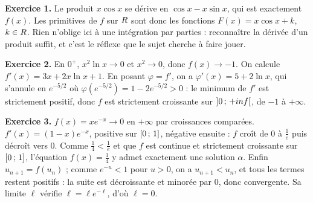 \begin{corrige}
\textbf{Exercice 1.} Le produit $x\cos x$ se dérive en $\cos x - x\sin x$, qui est
exactement $f(x)$. Les primitives de $f$ sur $R$ sont donc les fonctions
$F(x) = x\cos x + k$, $k\in R$. Rien n'oblige ici à une intégration par
parties : reconnaître la dérivée d'un produit suffit, et c'est le réflexe que
le sujet cherche à faire jouer.

\textbf{Exercice 2.} En $0^{+}$, $x^{2}\ln x\to0$ et $x^{2}\to0$, donc $f(x)\to-1$. On
calcule $f'(x) = 3x+2x\ln x+1$. En posant $\varphi = f'$, on a
$\varphi'(x) = 5+2\ln x$, qui s'annule en $e^{-5/2}$ où
$\varphi\!\left(e^{-5/2}\right) = 1-2e^{-5/2}>0$ : le minimum de $f'$ est
strictement positif, donc $f$ est strictement croissante sur
$\left]0\,;\,+inf\right[$, de $-1$ à $+\infty$.

\textbf{Exercice 3.} $f(x) = xe^{-x}\to0$ en $+\infty$ par croissances comparées.
$f'(x) = (1-x)e^{-x}$, positive sur $\left[0\,;\,1\right]$, négative ensuite :
$f$ croît de $0$ à $\frac1e$ puis décroît vers $0$. Comme
$\frac14 < \frac1e$ et que $f$ est continue et strictement croissante sur
$\left[0\,;\,1\right]$, l'équation $f(x) = \frac14$ y admet exactement une
solution $\alpha$. Enfin $u_{n+1} = f(u_{n})$ ; comme $e^{-u}<1$ pour $u>0$,
on a $u_{n+1}<u_{n}$, et tous les termes restent positifs : la suite est
décroissante et minorée par $0$, donc convergente. Sa limite $\ell$ vérifie
$\ell = \ell e^{-\ell}$, d'où $\ell = 0$.

\end{corrige}
